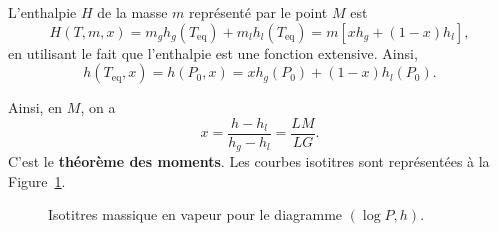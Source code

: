             L'enthalpie $H$ de la masse $m$ représenté par le point $M$ est 
            \begin{equation*}
                H(T,m,x)= m_g h_g(T_{\text{eq}})+m_l h_l(T_{\text{eq}})=m\left[x h_g+(1-x)h_l\right],
            \end{equation*}
            en utilisant le fait que l'enthalpie est une fonction extensive. Ainsi,
            \begin{equation*}
                \boxed{
                    h(T_{\text{eq}},x)=h(P_0,x)=xh_g(P_0)+(1-x)h_l(P_0).
                }
            \end{equation*}

            Ainsi, en $M$, on a 
            \begin{equation*}
                \boxed{
                    x=\frac{h-h_l}{h_g-h_l}=\frac{LM}{LG}.
                }
            \end{equation*}
            C'est le \textbf{théorème des moments}. Les courbes isotitres sont représentées à la Figure~\ref{fig:titre_vapeur_theoreme_moments_titre_massique_vapeur_isotitres}.
            \begin{figure}
                \centering
                \caption{Isotitres massique en vapeur pour le diagramme $(\log P,h)$.}    
                \label{fig:titre_vapeur_theoreme_moments_titre_massique_vapeur_isotitres}
            \end{figure}

